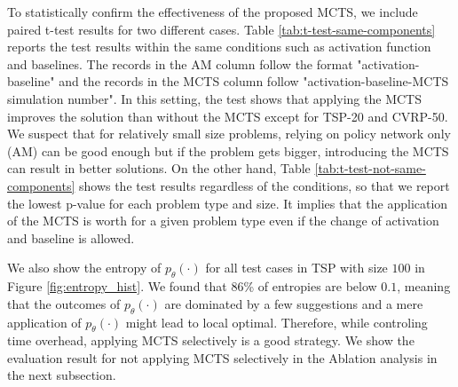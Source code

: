 \documentclass{article}
\begin{document}
\begin{table}[htbp]
  \centering
  \caption{t-test report regardless of the conditions}
  \label{tab:t-test-not-same-components}%
\end{table}%

To statistically confirm the effectiveness of the proposed MCTS, we include paired t-test results for two different cases. Table \ref{tab:t-test-same-components} reports the test results within the same conditions such as activation function and baselines. The records in the AM column follow the format "activation-baseline" and the records in the MCTS column follow "activation-baseline-MCTS simulation number". In this setting, the test shows that applying the MCTS improves the solution than without the MCTS except for TSP-20 and CVRP-50. We suspect that for relatively small size problems, relying on policy network only (AM) can be good enough but if the problem gets bigger, introducing the MCTS can result in better solutions.
On the other hand, Table \ref{tab:t-test-not-same-components} shows the test results regardless of the conditions, so that we report the lowest p-value for each problem type and size. It implies that the application of the MCTS is worth for a given problem type even if the change of activation and baseline is allowed.

We also show the entropy of $p_\theta(\cdot)$ for all test cases in TSP with size $100$ in Figure \ref{fig:entropy_hist}. We found that $86$\% of entropies are below $0.1$, meaning that the outcomes of $p_\theta(\cdot)$ are dominated by a few suggestions and a mere application of $p_\theta(\cdot)$ might lead to local optimal. Therefore, while controling time overhead, applying MCTS selectively is a good strategy. We show the evaluation result for not applying MCTS selectively in the Ablation analysis in the next subsection.
\end{document}
